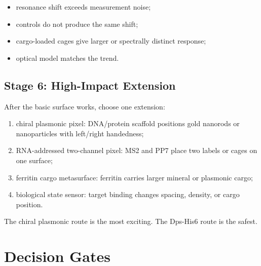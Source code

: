 \documentclass[11pt]{article}
\begin{document}
\begin{itemize}
\item resonance shift exceeds measurement noise;
\item controls do not produce the same shift;
\item cargo-loaded cages give larger or spectrally distinct response;
\item optical model matches the trend.
\end{itemize}

\subsection{Stage 6: High-Impact Extension}

After the basic surface works, choose one extension:

\begin{enumerate}
\item chiral plasmonic pixel: DNA/protein scaffold positions gold nanorods or nanoparticles with left/right handedness;
\item RNA-addressed two-channel pixel: MS2 and PP7 place two labels or cages on one surface;
\item ferritin cargo metasurface: ferritin carries larger mineral or plasmonic cargo;
\item biological state sensor: target binding changes spacing, density, or cargo position.
\end{enumerate}

The chiral plasmonic route is the most exciting. The Dps-His6 route is the safest.

\section{Decision Gates}
\end{document}
